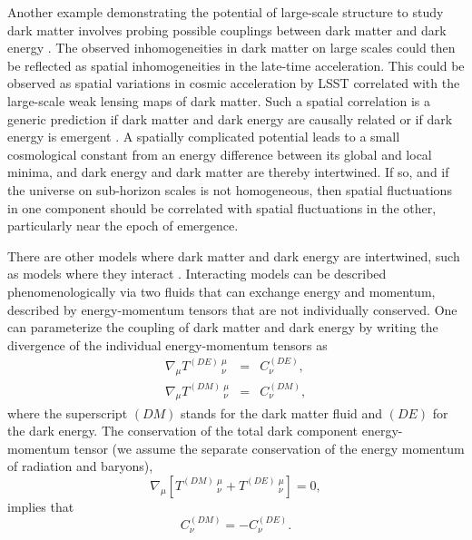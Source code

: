 Another example demonstrating the potential of large-scale structure to study dark matter involves probing possible couplings between dark matter and dark energy \citep[\eg][]{0801.1565}. %
The observed inhomogeneities in dark matter on large scales could then be reflected as spatial inhomogeneities in the late-time acceleration. 
This could be observed as spatial variations in cosmic acceleration by LSST correlated with the large-scale weak lensing maps of dark matter. 
Such a spatial correlation is a generic prediction if dark matter and dark energy are causally related or if dark energy is emergent \citep{1801.09658}. 
A spatially complicated potential leads to a small cosmological constant from an energy difference between its global and local minima, and dark energy and dark matter are thereby intertwined. 
If so, and if the universe on sub-horizon scales is not homogeneous, then spatial fluctuations in one component should be correlated with spatial fluctuations in the other, particularly near the epoch of emergence.

There are other models where dark matter and dark energy are intertwined, such as models where they interact 
\citep{Amendola:1999er,Holden:1999hm}.
Interacting models can be described phenomenologically via two fluids that can exchange energy and momentum, 
described by energy-momentum tensors that are not individually conserved. One can parameterize the coupling of
dark matter and dark energy by writing the divergence of the individual energy-momentum tensors as 
\begin{eqnarray}
\nabla_{\mu} T^{(DE)}\,^{\mu}_{\nu} &=& C^{(DE)}_{\nu}, \label{cons_phi} \\
\nabla_{\mu} T^{(DM)}\,^{\mu}_{\nu} &=& C^{(DM)}_{\nu}, \label{cons_dm}
\end{eqnarray}
where the superscript $(DM)$ stands for the dark matter fluid and $(DE)$ for the dark energy.
The conservation of the total dark component energy-momentum tensor 
(we assume the separate conservation of the energy momentum of radiation and baryons),
\begin{equation}
\label{energyconservation}
\nabla_{\mu} \left[ T^{(DM)} \,^{\mu}_{\nu} + T^{(DE)} \,^{\mu}_{\nu} \right]= 0,
\end{equation}
implies that
\begin{equation}
C^{(DM)}_{\nu}=-C^{(DE)}_{\nu}.
\end{equation}

